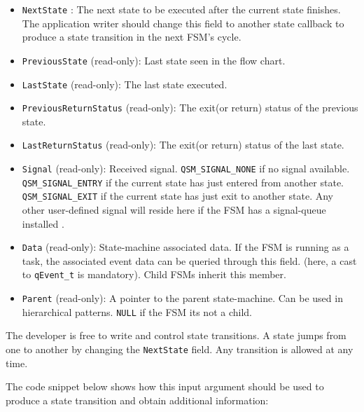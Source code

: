 \documentclass{article}
\begin{document}
\begin{itemize}
    \item \lstinline{NextState} : The next state to be executed after the current state finishes. The application writer should change this field to another state callback to produce a state transition in the next FSM's cycle.
    \item \lstinline{PreviousState} (read-only):  Last state seen in the flow chart.
    \item \lstinline{LastState} (read-only):  The last state executed.
    \item \lstinline{PreviousReturnStatus} (read-only): The exit(or return) status of the previous state.
    \item \lstinline{LastReturnStatus} (read-only): The exit(or return) status of the last state.
    \item \lstinline{Signal} (read-only): Received signal. \lstinline{QSM_SIGNAL_NONE} if no signal available. \lstinline{QSM_SIGNAL_ENTRY} if the current state has just entered from another state. \lstinline{QSM_SIGNAL_EXIT} if the current state has just exit to another state. Any other user-defined signal will reside here if the FSM has a signal-queue installed .
    \item \lstinline{Data} (read-only): State-machine associated data. If the FSM is running as a task, the associated event data can be queried through this field. (here, a cast to \lstinline{qEvent_t} is mandatory). Child FSMs inherit this member.
    \item \lstinline{Parent} (read-only): A pointer to the parent state-machine. Can be used in hierarchical  patterns. \lstinline{NULL} if the FSM its not a child.
\end{itemize}

The developer is free to write and control state transitions. A state jumps from one to another by changing the \lstinline{NextState} field. Any transition is allowed at any time.

The code snippet below shows how this input argument should be used to produce a state transition and obtain additional information: \\
\end{document}
